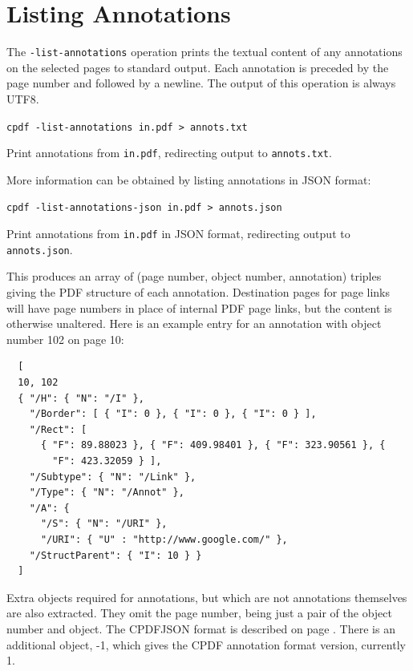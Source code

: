 \documentclass{book}
\begin{document}
  \section{Listing Annotations}
  The \texttt{-list-annotations} operation prints the textual content of any
annotations on the selected pages to standard output. Each annotation is preceded by the page number and followed by a newline. The output of this operation is always UTF8.
  \begin{framed}
    \noindent\small\verb!cpdf -list-annotations in.pdf > annots.txt!
    
    \vspace{2.5mm}
    \noindent Print annotations from \texttt{in.pdf}, redirecting output to \texttt{annots.txt}.
  \end{framed}

\noindent More information can be obtained by listing annotations in JSON format:

  \begin{framed}
    \noindent\small\verb!cpdf -list-annotations-json in.pdf > annots.json!
    
    \vspace{2.5mm}
    \noindent Print annotations from \texttt{in.pdf} in JSON format, redirecting output to \texttt{annots.json}.
  \end{framed}

\noindent This produces an array of (page number, object number, annotation) triples giving the PDF structure of each annotation. Destination pages for page links will have page numbers in place of internal PDF page links, but the content is otherwise unaltered. Here is an example entry for an annotation with object number 102 on page 10:

{\small\begin{verbatim}
  [
  10, 102
  { "/H": { "N": "/I" },
    "/Border": [ { "I": 0 }, { "I": 0 }, { "I": 0 } ],
    "/Rect": [
      { "F": 89.88023 }, { "F": 409.98401 }, { "F": 323.90561 }, {
        "F": 423.32059 } ],
    "/Subtype": { "N": "/Link" },
    "/Type": { "N": "/Annot" },
    "/A": {
      "/S": { "N": "/URI" },
      "/URI": { "U" : "http://www.google.com/" },
    "/StructParent": { "I": 10 } }
  ]
\end{verbatim}}

\noindent Extra objects required for annotations, but which are not annotations themselves are also extracted. They omit the page number, being just a pair of the object number and object. The CPDFJSON format is described on page \pageref{cpdfjson}. There is an additional object, -1, which gives the CPDF annotation format version, currently 1.
\end{document}
